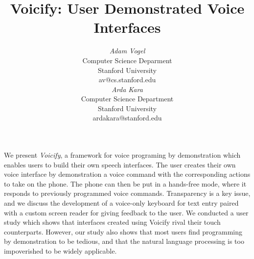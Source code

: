 \documentclass[letterpaper]{article}
\begin{document}




\title{Voicify: User Demonstrated Voice Interfaces}



\author{
\parbox[t]{9cm}{\centering
	     {\em Adam Vogel}\\
     Computer Science Deparment\\
             Stanford University \\
	     av@cs.stanford.edu}
\parbox[t]{9cm}{\centering
	     {\em Arda Kara}\\
	     Computer Science Department\\
       Stanford University\\
	     ardakara@stanford.edu}
}

\maketitle

\abstract
We present \emph{Voicify}, a framework for voice programing by 
demonstration which enables users to build their own speech interfaces.
The user creates their own voice interface by demonstration a voice command with the corresponding
actions to take on the phone. The phone can then be put in a hands-free mode, where it
responds to previously programmed voice commands. 
Transparency is a key issue, and we discuss the development of a voice-only keyboard for
text entry paired with a custom screen reader for giving feedback to the user.
We conducted a user study which shows that
interfaces created using Voicify rival their touch counterparts.
However, our study also shows that most users find programming by demonstration to be
tedious, and that the natural language processing is too impoverished to be widely applicable.
\end{document}
